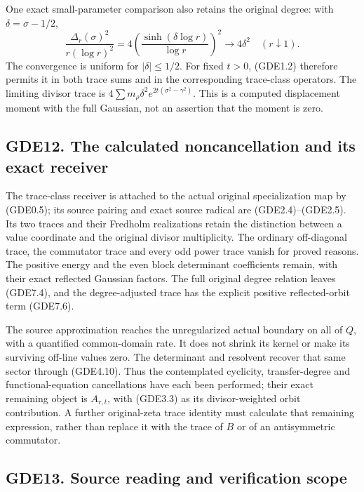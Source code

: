 One exact small-parameter comparison also retains the original degree:
with \(\delta=\sigma-1/2\), \[
\frac{\Delta_r(\sigma)^2}{r(\log r)^2}
=4\left(\frac{\sinh(\delta\log r)}{\log r}\right)^2
\longrightarrow4\delta^2\quad(r\downarrow1).
\tag{GDE11.6}
\] The convergence is uniform for \(|\delta|\le1/2\). For fixed \(t>0\),
(GDE1.2) therefore permits it in both trace sums and in the
corresponding trace-class operators. The limiting divisor trace is
\(4\sum m_\rho\delta^2e^{2t(\sigma^2-\gamma^2)}\). This is a computed
displacement moment with the full Gaussian, not an assertion that the
moment is zero.

\subsection{GDE12. The calculated noncancellation and its exact
receiver}\label{gde12.-the-calculated-noncancellation-and-its-exact-receiver}

The trace-class receiver is attached to the actual original
specialization map by (GDE0.5); its source pairing and exact source
radical are (GDE2.4)--(GDE2.5). Its two traces and their Fredholm
realizations retain the distinction between a value coordinate and the
original divisor multiplicity. The ordinary off-diagonal trace, the
commutator trace and every odd power trace vanish for proved reasons.
The positive energy and the even block determinant coefficients remain,
with their exact reflected Gaussian factors. The full original degree
relation leaves (GDE7.4), and the degree-adjusted trace has the explicit
positive reflected-orbit term (GDE7.6).

The source approximation reaches the unregularized actual boundary on
all of \(Q\), with a quantified common-domain rate. It does not shrink
its kernel or make its surviving off-line values zero. The determinant
and resolvent recover that same sector through (GDE4.10). Thus the
contemplated cyclicity, transfer-degree and functional-equation
cancellations have each been performed; their exact remaining object is
\(A_{r,t}\), with (GDE3.3) as its divisor-weighted orbit contribution. A
further original-zeta trace identity must calculate that remaining
expression, rather than replace it with the trace of \(B\) or of an
antisymmetric commutator.

\subsection{GDE13. Source reading and verification
scope}\label{gde13.-source-reading-and-verification-scope}

